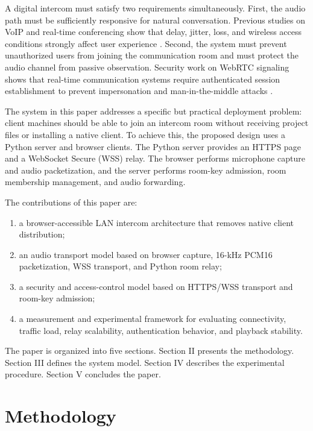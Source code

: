 \documentclass[conference]{IEEEtran}
\begin{document}
A digital intercom must satisfy two requirements simultaneously. First, the audio path must be sufficiently responsive for natural conversation. Previous studies on VoIP and real-time conferencing show that delay, jitter, loss, and wireless access conditions strongly affect user experience \cite{ieee_voip_delay_jitter,ieee_packet_loss_qoe,ieee_surecall}. Second, the system must prevent unauthorized users from joining the communication room and must protect the audio channel from passive observation. Security work on WebRTC signaling shows that real-time communication systems require authenticated session establishment to prevent impersonation and man-in-the-middle attacks \cite{ieee_webrtc_signaling_security}.

The system in this paper addresses a specific but practical deployment problem: client machines should be able to join an intercom room without receiving project files or installing a native client. To achieve this, the proposed design uses a Python server and browser clients. The Python server provides an HTTPS page and a WebSocket Secure (WSS) relay. The browser performs microphone capture and audio packetization, and the server performs room-key admission, room membership management, and audio forwarding.

The contributions of this paper are:
\begin{enumerate}
    \item a browser-accessible LAN intercom architecture that removes native client distribution;
    \item an audio transport model based on browser capture, 16-kHz PCM16 packetization, WSS transport, and Python room relay;
    \item a security and access-control model based on HTTPS/WSS transport and room-key admission;
    \item a measurement and experimental framework for evaluating connectivity, traffic load, relay scalability, authentication behavior, and playback stability.
\end{enumerate}

The paper is organized into five sections. Section II presents the methodology. Section III defines the system model. Section IV describes the experimental procedure. Section V concludes the paper.

\section{Methodology}
\end{document}
